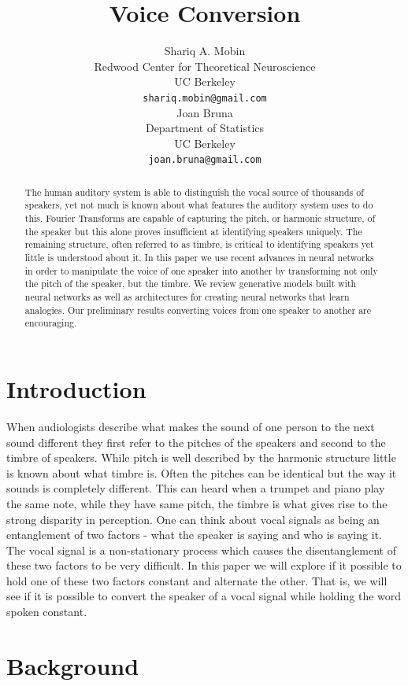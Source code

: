 \documentclass{article}
\title{Voice Conversion}
\author{
  Shariq A. Mobin \\
  Redwood Center for Theoretical Neuroscience \\
  UC Berkeley \\
  \texttt{shariq.mobin@gmail.com} \\
  \And
  Joan Bruna \\
  Department of Statistics \\
  UC Berkeley \\
  \texttt{joan.bruna@gmail.com}
}
\begin{document}

\maketitle

\begin{abstract}
    The human auditory system is able to distinguish the vocal source of thousands of speakers, yet not much is known about what features the auditory system uses to do this. Fourier Transforms are capable of capturing the pitch, or harmonic structure, of the speaker but this alone proves insufficient at identifying speakers uniquely. The remaining structure, often referred to as timbre, is critical to identifying speakers yet little is understood about it. In this paper we use recent advances in neural networks in order to manipulate the voice of one speaker into another by transforming not only the pitch of the speaker, but the timbre. We review generative models built with neural networks as well as architectures for creating neural networks that learn analogies. Our preliminary results converting voices from one speaker to another are encouraging.
\end{abstract}

\section{Introduction}
    When audiologists describe what makes the sound of one person to the next sound different they first refer to the pitches of the speakers and second to the timbre of speakers. While pitch is well described by the harmonic structure little is known about what timbre is. Often the pitches can be identical but the way it sounds is completely different. This can heard when a trumpet and piano play the same note, while they have same pitch, the timbre is what gives rise to the strong disparity in perception.
    One can think about vocal signals as being an entanglement of two factors - what the speaker is saying and who is saying it. The vocal signal is a non-stationary process which causes the disentanglement of these two factors to be very difficult. In this paper we will explore if it possible to hold one of these two factors constant and alternate the other. That is, we will see if it is possible to convert the speaker of a vocal signal while holding the word spoken constant.

\section{Background}
\end{document}
